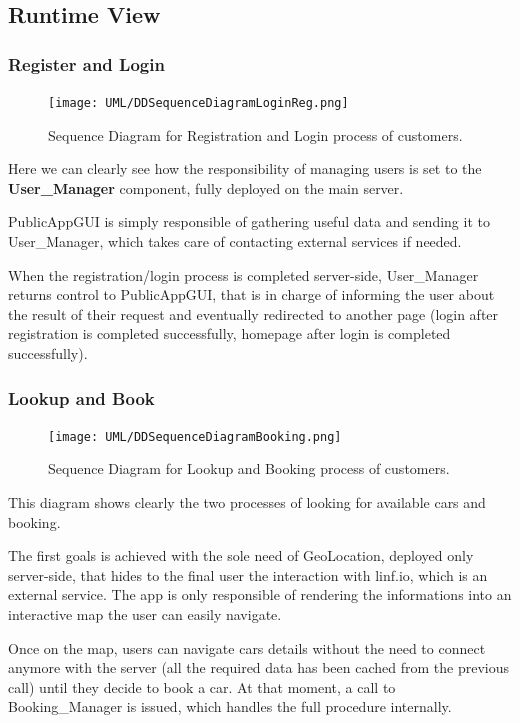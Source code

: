 \documentclass[11pt]{article} %
\begin{document}
\subsection{Runtime View}

\subsubsection{Register and Login}
\begin{figure}[H]
	\centering
	\texttt{[image: UML/DDSequenceDiagramLoginReg.png]}
	\caption{Sequence Diagram for Registration and Login process of customers.	}
\end{figure}	
Here we can clearly see how the responsibility of managing users is set to the \textbf{User\_Manager} component, fully deployed on the main server.

PublicAppGUI is simply responsible of gathering useful data and sending it to User\_Manager, which takes care of contacting external services if needed. 

When the registration/login process is completed server-side, User\_Manager returns control to PublicAppGUI, that is in charge of informing the user about the result of their request and eventually redirected to another page (login after registration is completed successfully, homepage after login is completed successfully).

\subsubsection{Lookup and Book}
\begin{figure}[H]
	\centering
	\texttt{[image: UML/DDSequenceDiagramBooking.png]}
	\caption{Sequence Diagram for Lookup and Booking process of customers.}
\end{figure}
This diagram shows clearly the two processes of looking for available cars and booking.

The first goals is achieved with the sole need of GeoLocation, deployed only server-side, that hides to the final user the interaction with linf.io, which is an external service. The app is only responsible of rendering the informations into an interactive map the user can easily navigate.

Once on the map, users can navigate cars details without the need to connect anymore with the server (all the required data has been cached from the previous call) until they decide to book a car. At that moment, a call to Booking\_Manager is issued, which handles the full procedure internally.
\end{document}
